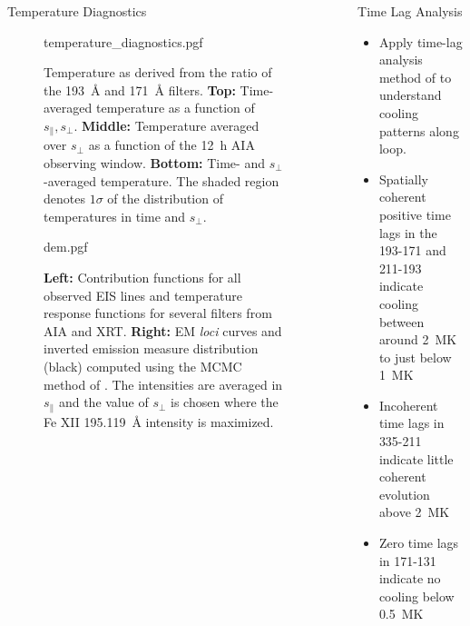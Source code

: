 \documentclass[final]{beamer}
\newlength{\sepwidth}
\newlength{\colwidth}
\newcommand{\separatorcolumn}{\begin{column}{\sepwidth}\end{column}}
\begin{document}
\begin{frame}[t]
\begin{columns}[t]
\begin{column}{\colwidth}
\begin{block}{Temperature Diagnostics}
    \vspace{-50pt}
    \begin{figure}[H]
      \centering
      {temperature_diagnostics.pgf}
      \caption{Temperature as derived from the ratio of the \SI{193}{\angstrom} and \SI{171}{\angstrom} filters. \textbf{Top:} Time-averaged temperature as a function of $s_\parallel,s_\perp$. \textbf{Middle:} Temperature averaged over $s_\perp$ as a function of the \SI{12}{\hour} AIA observing window. \textbf{Bottom:} Time- and $s_\perp$-averaged temperature. The shaded region denotes $1\sigma$ of the distribution of temperatures in time and $s_\perp$.}
      \label{fig:filter_ratio}
    \end{figure}
    \vspace{-30pt}
    \vspace{-50pt}
    \begin{figure}[H]
      \centering
      {dem.pgf}
      \caption{\textbf{Left:} Contribution functions for all observed EIS lines and temperature response functions for several filters from AIA and XRT. \textbf{Right:} EM \textit{loci} curves and inverted emission measure distribution (black) computed using the MCMC method of \citet{kashyap_markov-chain_1998}. The intensities are averaged in $s_\parallel$ and the value of $s_\perp$ is chosen where the Fe XII \SI{195.119}{\angstrom} intensity is maximized.}
      \label{fig:dem_observed}
    \end{figure}

  \end{block}

\end{column}

\separatorcolumn

\begin{column}{\colwidth}

  \begin{block}{Time Lag Analysis}

    \begin{itemize}
      \item Apply time-lag analysis method of \citet{viall_evidence_2012,barnes_understanding_2019} to understand cooling patterns along loop.
      \item Spatially coherent positive time lags in the 193-171 and 211-193 indicate cooling between around \SI{2}{\mega\K} to just below \SI{1}{\mega\K}
      \item Incoherent time lags in 335-211 indicate little coherent evolution above \SI{2}{\mega\K}
      \item Zero time lags in 171-131 indicate no cooling below \SI{0.5}{\mega\K}
    \end{itemize}


\end{block}
\end{column}
\end{columns}
\end{frame}
\end{document}
